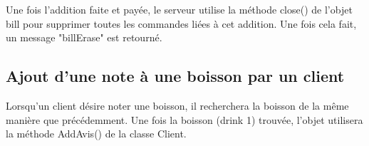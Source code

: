 Une fois l'addition faite et payée, le serveur utilise la méthode close() de l'objet bill pour supprimer toutes les commandes liées à cet addition. Une fois cela fait, un message "billErase" est retourné.

\subsection{Ajout d'une note à une boisson par un client} 

Lorsqu'un client désire noter une boisson, il recherchera la boisson de la même manière que précédemment. Une fois la boisson (drink 1) trouvée, l'objet utilisera la méthode AddAvis() de la classe Client.


